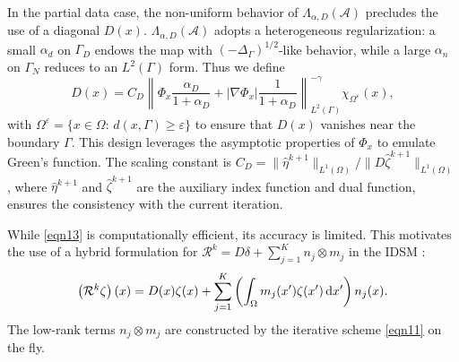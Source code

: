 \documentclass[onefignum,onetabnum]{siamart190516}
\numberwithin{equation}{section}
\begin{document}
In the partial data case, the non-uniform behavior of $\Lambda_{\alpha,D}(\mathcal{A})$ precludes the use of a diagonal $D(x)$.
$\Lambda_{\alpha,D}(\mathcal{A})$ adopts a heterogeneous regularization: a small $\alpha_{d}$ on $\Gamma_D$ endows the map with $(-\Delta_\Gamma)^{1/2}$-like behavior, while a large $\alpha_{n}$ on $\Gamma_N$ reduces to an $L^2(\Gamma)$ form.
Thus we define
\begin{equation}\label{eqn16}
D(x) = C_{D}\left\| \Phi_x \frac{\alpha_{D}}{1+\alpha_{D}} + |\nabla \Phi_x|\frac{1}{1+\alpha_{D}} \right\|_{L^2(\Gamma)}^{-\gamma}\chi_{\Omega^{\varepsilon}}(x),
\end{equation}
with $\Omega^{\varepsilon}=\{x\in \Omega:\,d(x,\Gamma)\geq \varepsilon\}$ {to ensure that $D(x)$ vanishes near the boundary $\Gamma$.}
This design leverages the asymptotic properties of $\Phi_x$ to emulate Green's function.
The scaling constant is $C_D = \|\hat{\eta}^{k+1}\|_{L^{1}(\Omega)} / \|D\hat{\zeta}^{k+1}\|_{L^{1}(\Omega)}$, where $\hat{\eta}^{k+1}$ and $\hat{\zeta}^{k+1}$ are the auxiliary index function and dual function, ensures the consistency with the current iteration.

While \eqref{eqn13} is computationally efficient, its accuracy is limited.
This motivates the use of a hybrid formulation for $\mathcal{R}^{k} = D\delta + \sum_{j=1}^{K} n_{j} \otimes m_{j}$ in the IDSM \cite{Ito2025Iterative}:
\begin{equation}\label{eqn17}
\left(\mathcal{R}^{k}\zeta\right)(x) = D(x)\zeta(x) + \sum_{j=1}^{K} \left( \int_{\Omega} m_{j}(x') \zeta(x') \, {\rm d}x' \right) n_j(x).
\end{equation}
The low-rank terms $n_{j} \otimes m_{j}$ are constructed by the iterative scheme \eqref{eqn11} on the fly.
\end{document}
